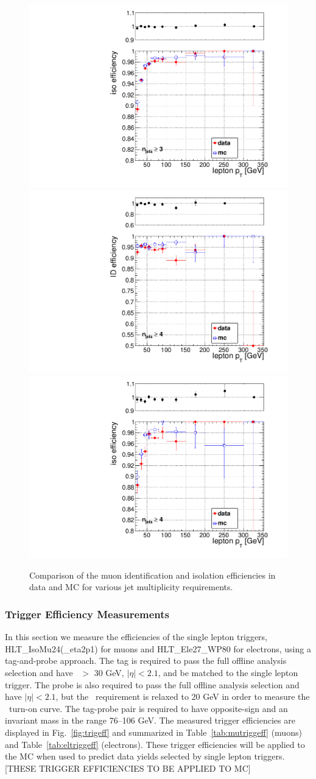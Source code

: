 \begin{figure}[hbt]
\begin{center}
	\includegraphics[width=0.3\linewidth]{plots/mu_iso_njets3.pdf}
	\includegraphics[width=0.3\linewidth]{plots/mu_id_njets4.pdf}%
	\includegraphics[width=0.3\linewidth]{plots/mu_iso_njets4.pdf}
	\caption{
	  \label{fig:mutnpeff} Comparison of the muon identification and isolation efficiencies in data and MC for various jet multiplicity requirements. }  
      \end{center}
\end{figure}



\clearpage

\subsubsection{Trigger Efficiency Measurements}

In this section we measure the efficiencies of the single lepton triggers, HLT\_IsoMu24(\_eta2p1) for muons and HLT\_Ele27\_WP80 for electrons, using a tag-and-probe
approach. The tag is required to pass the full offline analysis selection and have \pt\ $>$ 30 GeV, $|\eta|<2.1$, and be matched to the single
lepton trigger. The probe is also required to pass the full offline analysis selection and have $|\eta|<2.1$, but the \pt\ requirement is relaxed to 20 GeV
in order to measure the \pt\ turn-on curve. The tag-probe pair is required to have opposite-sign and an invariant mass in the range 76--106 GeV.
The measured trigger efficiencies are displayed in Fig.~\ref{fig:trigeff} and summarized in Table~\ref{tab:mutriggeff} (muons) and Table~\ref{tab:eltriggeff} (electrons).
These trigger efficiencies will be applied to the MC when used to predict data yields selected by single lepton triggers. [THESE TRIGGER EFFICIENCIES TO BE APPLIED TO MC]



